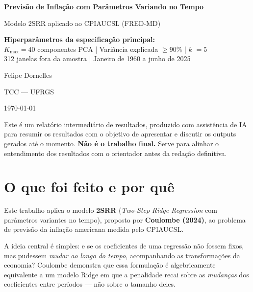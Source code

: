 \documentclass[12pt, a4paper]{article}
\begin{document}
\begin{titlepage}
  \centering
  \vspace*{2cm}
  {\Large \textbf{Previsão de Inflação com Parâmetros Variando no Tempo}\par}
  \vspace{0.5cm}
  {\large Modelo 2SRR aplicado ao CPIAUCSL (FRED-MD)\par}
  \vspace{1.5cm}
  {\normalsize
    \textbf{Hiperparâmetros da especificação principal:}\\[0.3em]
    $K_{\max} = 40$ componentes PCA \quad|\quad
    Variância explicada $\geq 90\%$ \quad|\quad
    $k$ $= 5$\\[0.3em]
    312 janelas fora da amostra \quad|\quad
    Janeiro de 1960 a junho de 2025
  }
  \vspace{1.5cm}
  {\large Felipe Dornelles\par}
  \vspace{0.5cm}
  {\normalsize TCC --- UFRGS\par}
  \vspace{0.5cm}
  {\normalsize \today\par}
  \vfill
  \begin{atencao}
    Este é um relatório intermediário de resultados, produzido
    com assistência de IA para resumir os resultados com o
    objetivo de apresentar e discutir os outputs gerados até o momento.
    \textbf{Não é o trabalho final.} Serve para alinhar o entendimento
    dos resultados com o orientador antes da redação definitiva.
  \end{atencao}
\end{titlepage}

\tableofcontents
\newpage

\section{O que foi feito e por quê}
\label{sec:contexto}

Este trabalho aplica o modelo \textbf{2SRR} (\textit{Two-Step
Ridge Regression} com parâmetros variantes no tempo), proposto
por \textbf{Coulombe (2024)}, ao problema de previsão da inflação
americana medida pelo CPIAUCSL.

A ideia central é simples: e se os coeficientes de uma regressão
não fossem fixos, mas pudessem \emph{mudar ao longo do tempo},
acompanhando as transformações da economia? Coulombe demonstra
que essa formulação é algebricamente equivalente a um modelo
Ridge em que a penalidade recai sobre as \emph{mudanças} dos
coeficientes entre períodos --- não sobre o tamanho deles.
\end{document}
